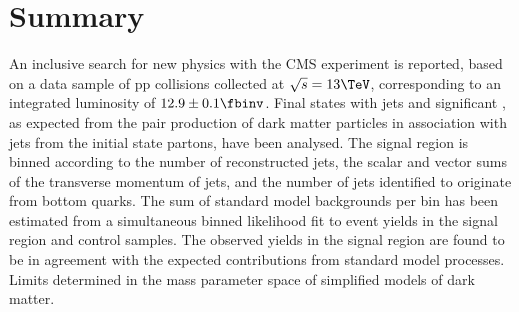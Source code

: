 \section{Summary}
\label{sec:summary}

An inclusive search for new physics with the CMS experiment is
reported, based on a data sample of pp collisions collected at
$\sqrt{s} = 13\TeV$, corresponding to an integrated luminosity of $12.9
\pm 0.1 \fbinv$. Final states with jets and significant \ETmiss, as
expected from the pair production of dark matter particles in association with jets from the initial state partons,
have been analysed. The signal region is binned according to the
number of reconstructed jets, the scalar and vector sums of the
transverse momentum of jets, and the number of jets identified to
originate from bottom quarks. The sum of standard model backgrounds
per bin has been estimated from a simultaneous binned likelihood fit
to event yields in the signal region and control samples. The observed
yields in the signal region are found to be in agreement with the
expected contributions from standard model processes. Limits %
 determined in the mass parameter space of
simplified models of dark matter.

